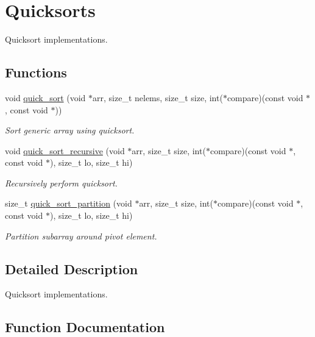 \hypertarget{group__QuickSort}{}\section{Quicksorts}
\label{group__QuickSort}


Quicksort implementations.  


\subsection*{Functions}
\begin{DoxyCompactItemize}
\item 
void \hyperlink{group__QuickSort_gacc1abed6e3519de02d60503e0b214932}{quick\+\_\+sort} (void $\ast$arr, size\+\_\+t nelems, size\+\_\+t size, int($\ast$compare)(const void $\ast$, const void $\ast$))
\begin{DoxyCompactList}\small\item\em Sort generic array using quicksort. \end{DoxyCompactList}\item 
void \hyperlink{group__QuickSort_gab75f75c672e70afad6178c3055547777}{quick\+\_\+sort\+\_\+recursive} (void $\ast$arr, size\+\_\+t size, int($\ast$compare)(const void $\ast$, const void $\ast$), size\+\_\+t lo, size\+\_\+t hi)
\begin{DoxyCompactList}\small\item\em Recursively perform quicksort. \end{DoxyCompactList}\item 
size\+\_\+t \hyperlink{group__QuickSort_gae45617fa4741c13bc601fe2a984fdc2c}{quick\+\_\+sort\+\_\+partition} (void $\ast$arr, size\+\_\+t size, int($\ast$compare)(const void $\ast$, const void $\ast$), size\+\_\+t lo, size\+\_\+t hi)
\begin{DoxyCompactList}\small\item\em Partition subarray around pivot element. \end{DoxyCompactList}\end{DoxyCompactItemize}


\subsection{Detailed Description}
Quicksort implementations. 



\subsection{Function Documentation}
\mbox{\label{group__QuickSort_gacc1abed6e3519de02d60503e0b214932}} 
